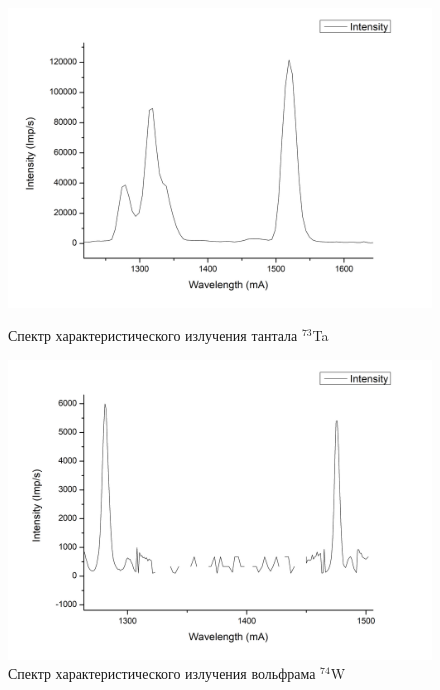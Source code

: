\documentclass[a4paper]{article}
\begin{document}
\begin{enumerate}
    \begin{figure}[h]
\begin{center}
\begin{minipage}[h]{0.45\linewidth}
\includegraphics[width=1\linewidth]{Ta.png}
\caption{Спектр характеристического излучения тантала $^{73}$Ta} %
\end{minipage}
\hfill 
\begin{minipage}[h]{0.45\linewidth}
\includegraphics[width=1\linewidth]{W.png}
\caption{Спектр характеристического излучения вольфрама $^{74}$W}
\label{ris:experimcoded}
\end{minipage}
\end{center}
\end{figure}


\end{enumerate}
\end{document}
